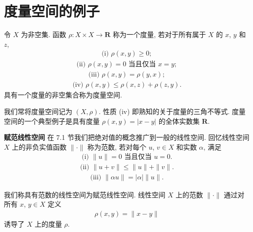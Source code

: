 \documentclass[../../main.tex]{subfiles}
\begin{document}
\section{度量空间的例子}\label{section:ch09-度量空间的例子}

\begin{definition}[度量]\label{definition:ch09-度量}
令 $X$ 为非空集. 函数 $\rho:X\times X\to\mathbf{R}$ 称为一个度量, 若对于所有属于 $X$ 的 $x$, $y$ 和 $z$,
\begin{align*}
\text{(i) }\rho(x,y)\geqslant 0;
\end{align*}
\begin{align*}
\text{(ii) }\rho(x,y)=0\text{ 当且仅当 }x=y;
\end{align*}
\begin{align*}
\text{(iii) }\rho(x,y)=\rho(y,x);
\end{align*}
\begin{align*}
\text{(iv) }\rho(x,y)\leqslant\rho(x,z)+\rho(z,y).
\end{align*}
具有一个度量的非空集合称为度量空间.
\end{definition}

我们常将度量空间记为 $(X,\rho)$. 性质 (iv) 即熟知的关于度量的三角不等式. 度量空间的一个典型例子是具有度量 $\rho(x,y)=|x-y|$ 的全体实数集 $\mathbf{R}$.

\textbf{赋范线性空间} 在 7.1 节我们把绝对值的概念推广到一般的线性空间. 回忆线性空间 $X$ 上的非负实值函数 $\|\cdot\|$ 称为范数, 若对每个 $u$, $v\in X$ 和实数 $\alpha$, 满足
\begin{align*}
\text{(i) }\|u\|=0\text{ 当且仅当 }u=0.
\end{align*}
\begin{align*}
\text{(ii) }\|u+v\|\leqslant\|u\|+\|v\|.
\end{align*}
\begin{align*}
\text{(iii) }\|\alpha u\|=|\alpha|\|u\|.
\end{align*}

我们称具有范数的线性空间为赋范线性空间. 线性空间 $X$ 上的范数 $\|\cdot\|$ 通过对所有 $x$, $y\in X$ 定义
\begin{align}
\rho(x,y)=\|x-y\|\label{align:ch09-范数诱导度量}
\end{align}
诱导了 $X$ 上的度量 $\rho$.
\end{document}
